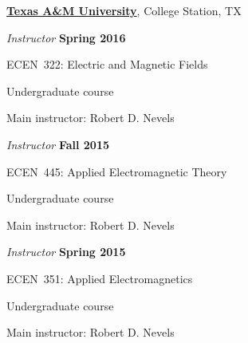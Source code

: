 \documentclass[10pt]{article}
\newcommand{\halfblankline}{\quad\vspace{-0.5\baselineskip}\pagebreak[3]}
\begin{document}
\href{http://www.tamu.edu/}{\textbf{Texas A\&M University}},
College Station, TX
\begin{outerlist}
\item[] \textit{Instructor} \hfill \textbf{Spring 2016}
    \begin{innerlist}
        \item ECEN~322: Electric and Magnetic Fields
        \begin{innerlist}
            \item[] Undergraduate course
            \item[] Main instructor: Robert D. Nevels
        \end{innerlist}
    \end{innerlist}

\item[] \textit{Instructor} \hfill \textbf{Fall 2015}
    \begin{innerlist}
        \item ECEN~445: Applied Electromagnetic Theory
        \begin{innerlist}
            \item[] Undergraduate course
            \item[] Main instructor: Robert D. Nevels
        \end{innerlist}
    \end{innerlist}

\item[] \textit{Instructor} \hfill \textbf{Spring 2015}
    \begin{innerlist}
        \item ECEN~351: Applied Electromagnetics
        \begin{innerlist}
            \item[] Undergraduate course
            \item[] Main instructor: Robert D. Nevels
        \end{innerlist}
    \end{innerlist}

\end{outerlist}

\halfblankline
\end{document}
